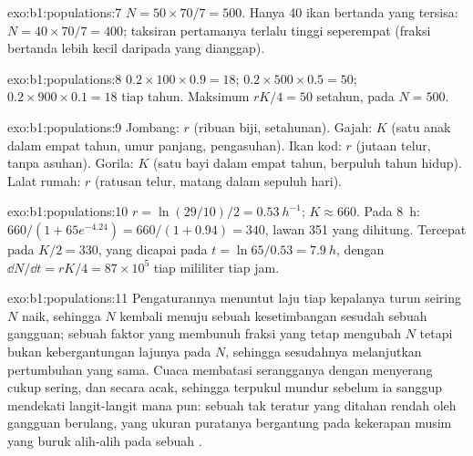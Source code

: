 \begin{solution}{exo:b1:populations:7}
$N = 50\times 70/7 = 500$. Hanya 40 ikan bertanda yang tersisa: $N = 40\times
70/7 = 400$; taksiran pertamanya terlalu tinggi seperempat (fraksi
bertanda  lebih kecil daripada yang dianggap).
\end{solution}

\begin{solution}{exo:b1:populations:8}
$0.2\times 100\times 0.9 = 18$; $0.2\times 500\times 0.5 = 50$;
$0.2\times 900\times 0.1 = 18$ tiap tahun. Maksimum $rK/4 = 50$ setahun, pada
$N = 500$.
\end{solution}

\begin{solution}{exo:b1:populations:9}
Jombang: $r$ (ribuan biji, setahunan). Gajah: $K$ (satu anak dalam
empat tahun, umur panjang, pengasuhan). Ikan kod: $r$ (jutaan telur,
tanpa asuhan). Gorila: $K$ (satu bayi dalam empat tahun, berpuluh
tahun hidup). Lalat rumah: $r$ (ratusan telur, matang dalam sepuluh
hari).
\end{solution}

\begin{solution}{exo:b1:populations:10}
$r = \ln(29/10)/2 = \qty{0.53}{h^{-1}}$; $K \approx 660$. Pada \qty{8}{h}:
$660/(1 + 65e^{-4.24}) = 660/(1 + 0.94) = 340$, lawan 351 yang dihitung.
Tercepat pada $K/2 = 330$, yang dicapai pada $t = \ln 65/0.53 = \qty{7.9}{h}$,
dengan $\dd N/\dd t = rK/4 = 87\times 10^5$  tiap mililiter tiap
jam.
\end{solution}

\begin{solution}{exo:b1:populations:11}
Pengaturannya menuntut laju tiap kepalanya turun seiring $N$ naik,
sehingga $N$ kembali menuju sebuah kesetimbangan sesudah sebuah
gangguan; sebuah faktor yang membunuh fraksi yang tetap mengubah $N$
tetapi bukan kebergantungan lajunya pada $N$, sehingga sesudahnya
 melanjutkan pertumbuhan yang sama. Cuaca membatasi
serangganya dengan menyerang cukup sering, dan secara acak, sehingga
 terpukul mundur sebelum ia sanggup mendekati langit-langit
mana pun: sebuah  tak teratur yang ditahan rendah oleh
gangguan berulang, yang ukuran puratanya bergantung pada kekerapan
musim yang buruk alih-alih pada sebuah .
\end{solution}

